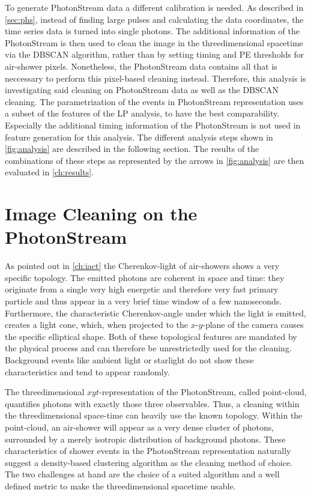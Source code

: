 %
To generate PhotonStream data a different calibration is needed. As described
in \autoref{sec:phs}, instead of finding large pulses and calculating the data
coordinates, the time series data is turned into single photons. The additional
information of the PhotonStream is then used to clean the image in the
threedimensional spacetime via the DBSCAN algorithm, rather than by setting
timing and PE thresholds for air-shower pixels. Nonetheless, the PhotonStream
data contains all that is neccessary to perform this pixel-based cleaning
instead. Therefore, this analysis is investigating said cleaning on
PhotonStream data as well as the DBSCAN cleaning. The parametrization of the
events in PhotonStream representation uses a subset of the features of the LP
analysis, to have the best comparability. Especially the additional timing
information of the PhotonStream is not used in feature generation for this
analysis. The different analysis steps shown in \autoref{fig:analysis} are
described in the following section. The results of the combinations of these
steps as represented by the arrows in \autoref{fig:analysis} are then evaluated
in \autoref{ch:results}.

\section{Image Cleaning on the PhotonStream}\label{sec:phs_clean}
%
As pointed out in \autoref{ch:iact} the Cherenkov-light of air-showers shows a
very specific topology. The emitted photons are coherent in space and time:
they originate from a single very high energetic and therefore very fast
primary particle and thus appear in a very brief time window of a few
nanoseconds. Furthermore, the characteristic Cherenkov-angle under which the
light is emitted, creates a light cone, which, when projected to the
$x$-$y$-plane of the camera causes the specific elliptical shape. Both of these
topological features are mandated by the physical process and can therefore be
unrestrictedly used for the cleaning. Background events like ambient light or
starlight do not show these characteristics and tend to appear randomly.

The threedimensional $xyt$-representation of the PhotonStream, called point-cloud, quantifies photons with exactly those three observables. Thus, a cleaning
within the threedimensional space-time can heavily use the known topology.
Within the point-cloud, an air-shower will appear as a very dense cluster of
photons, surrounded by a merely isotropic distribution of background photons.
These characteristics of shower events in the PhotonStream representation
naturally suggest a density-based clustering algorithm as the cleaning method
of choice. The two challenges at hand are the choice of a suited algorithm and
a well defined metric to make the threedimensional spacetime usable.

